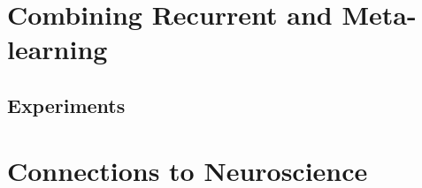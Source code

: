 \documentclass{article}
\begin{document}

\section{Combining Recurrent and Meta-learning}
\subsection{Experiments}
\section{Connections to Neuroscience}
\end{document}
